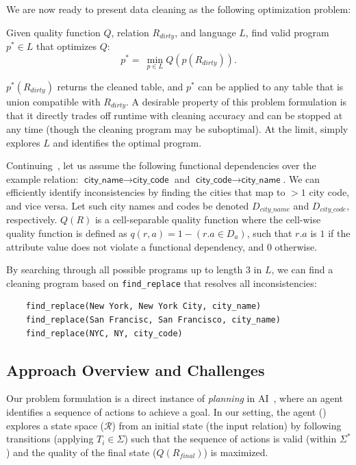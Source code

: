 \noindent We are now ready to present data cleaning as the following optimization problem:
\begin{problem}
Given quality function $Q$, relation $R_{dirty}$, and language $L$, find valid program $p^* \in L$ that optimizes $Q$:
\[
p^* = ~ \min_{p \in L} Q( p(R_{dirty}) ).  
\]
\end{problem}
$p^*(R_{dirty})$ returns the cleaned table, and $p^*$ can be applied to any table that is union compatible with $R_{dirty}$.
A desirable property of this problem formulation is that it directly trades off runtime with cleaning accuracy and can be stopped at any time (though the cleaning program may be suboptimal).  At the limit, \sys simply explores $L$ and identifies the optimal program.


\begin{example}\label{ex3}
Continuing~, let us assume the following functional dependencies over the example relation: $\textsf{city\_name} \rightarrow \textsf{city\_code}$ and $\textsf{city\_code} \rightarrow \textsf{city\_name}$.
We can efficiently identify inconsistencies by finding the cities that map to $>1$ city code, and vice versa.   Let such city names and codes be denoted $D_{city\_name}$ and $D_{city\_code}$, respectively.
$Q(R)$ is a cell-separable quality function where the cell-wise quality function is defined as $q(r, a) = 1 - (r.a \in D_a)$, such that $r.a$ is $1$ if the attribute value does not violate a functional dependency, and $0$ otherwise.

By searching through all possible programs up to length 3 in $L$, we can find a cleaning program based on \texttt{find\_replace} that resolves all inconsistencies:
\begin{lstlisting}
    find_replace(New York, New York City, city_name)
    find_replace(San Francisc, San Francisco, city_name)
    find_replace(NYC, NY, city_code)
\end{lstlisting}
\end{example}


\subsection*{Approach Overview and Challenges}
Our problem formulation is a direct instance of {\it planning} in AI~\cite{russell1995modern}, where an agent identifies a sequence of actions to achieve a goal.  In our setting, the agent (\sys) explores a state space ($\mathcal{R}$) from an initial state (the input relation) by following transitions (applying $T_i \in \Sigma$) such that the sequence of actions is valid (within $\Sigma^*$) and the quality of the final state ($Q(R_{final})$) is maximized.  

